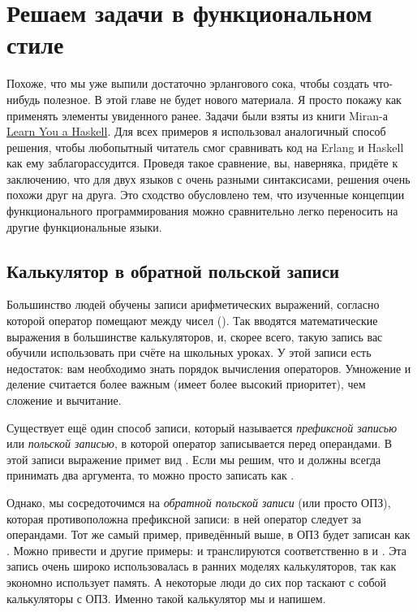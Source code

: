 \chapter{Решаем задачи в функциональном стиле}
\label{functionally-solving-problems}
\colorbox{lgray}
{
\begin{minipage}{1.0\linewidth}
    Похоже, что мы уже выпили достаточно эрлангового сока, чтобы создать что\--нибудь полезное.
    В этой главе не будет нового материала.
    Я просто покажу как применять элементы увиденного ранее.
    Задачи были взяты из книги Miran\--а \href{http://learnyouahaskell.com/functionally-solving-problems}{Learn You a Haskell}.
    Для всех примеров я использовал аналогичный способ решения, чтобы любопытный читатель смог сравнивать код на Erlang и Haskell как ему заблагорассудится.
    Проведя такое сравнение, вы, наверняка, придёте к заключению, что для двух языков с очень разными синтаксисами, решения очень похожи друг на друга.
    Это сходство обусловлено тем, что изученные концепции функционального программирования можно сравнительно легко переносить на другие функциональные языки.
\end{minipage}
}
\section{Калькулятор в обратной польской записи}
\label{reverse-polish-notation-calculator}
Большинство людей обучены записи арифметических выражений, согласно которой оператор помещают между чисел ().
Так вводятся математические выражения в большинстве калькуляторов, и, скорее всего,  такую запись вас обучили использовать при счёте на школьных уроках. 
У этой записи есть недостаток: вам необходимо знать порядок вычисления операторов.
Умножение и деление считается более важным (имеет более высокий приоритет), чем сложение и вычитание.

Существует ещё один способ записи, который называется \emph{префиксной записью} или \emph{польской записью}, в которой оператор записывается перед операндами.
В этой записи выражение  примет вид .
Если мы решим, что \ops{+\strut}  и \ops{/\strut} должны всегда принимать два аргумента, то  можно просто записать как .

Однако, мы сосредоточимся на \emph{обратной польской записи} (или просто ОПЗ), которая противоположна префиксной записи: в ней оператор следует за операндами.
Тот же самый пример, приведённый выше, в ОПЗ будет записан как .
Можно привести и другие примеры:  и  транслируются соответственно в  и .
Эта запись очень широко использовалась в ранних моделях калькуляторов, так как экономно использует память.
А некоторые люди до сих пор таскают с собой калькуляторы с ОПЗ.
Именно такой калькулятор мы и напишем.


